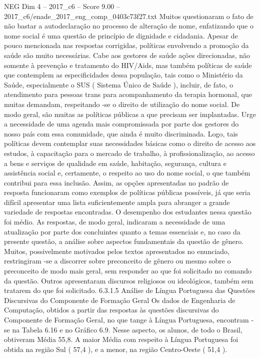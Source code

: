 \begin{textsample}{NEG Dim 4 – 2017\_c6 – Score 9.00 – 2017\_c6/enade\_2017\_eng\_comp\_0403c73f27.txt}
Muitos questionaram o fato de não bastar a autodeclaração no processo de alteração de nome, enfatizando que o nome social é uma questão de princípio de dignidade e cidadania.
Apesar de pouco mencionada nas respostas corrigidas, políticas envolvendo a promoção da saúde são muito necessárias.
Cabe aos gestores de saúde ações direcionadas, não somente à prevenção e tratamento do HIV/Aids, mas também políticas de saúde que contemplem as especificidades dessa população, tais como o Ministério da Saúde, especialmente o SUS ( Sistema Único de Saúde ), incluir, de fato, o atendimento para pessoas trans para acompanhamento da terapia hormonal, que muitas demandam, respeitando -se o direito de utilização do nome social.
De modo geral, são muitas as políticas públicas a que precisam ser implantadas.
Urge a necessidade de uma agenda mais compromissada por parte dos gestores do nosso país com essa comunidade, que ainda é muito discriminada.
Logo, tais políticas devem contemplar suas necessidades básicas como o direito de acesso aos estudos, à capacitação para o mercado de trabalho, à profissionalização, ao acesso a bens e serviços de qualidade em saúde, habitação, segurança, cultura e assistência social e, certamente, o respeito ao uso do nome social, o que também contribui para essa inclusão.
Assim, as opções apresentadas no padrão de resposta funcionaram como exemplos de políticas públicas possíveis, já que seria difícil apresentar uma lista suficientemente ampla para abranger a grande variedade de respostas encontradas.
O desempenho dos estudantes nessa questão foi médio.
As respostas, de modo geral, indicaram a necessidade de uma atualização por parte dos concluintes quanto a temas essenciais e, no caso da presente questão, a análise sobre aspectos fundamentais da questão de gênero.
Muitos, possivelmente motivados pelos textos apresentados no enunciado, restringiram -se a discorrer sobre preconceito de gênero ou mesmo sobre o preconceito de modo mais geral, sem responder ao que foi solicitado no comando da questão.
Outros apresentaram discursos religiosos ou ideológicos, também sem tratarem do que foi solicitado. 6.3.1.5 Análise de Língua Portuguesa das Questões Discursivas do Componente de Formação Geral Os dados de Engenharia de Computação, obtidos a partir das respostas às questões discursivas do Componente de Formação Geral, no que tange à Língua Portuguesa, encontram -se na Tabela 6.16 e no Gráfico 6.9.
Nesse aspecto, os alunos, de todo o Brasil, obtiveram Média 55,8.
A maior Média com respeito à Língua Portuguesa foi obtida na região Sul ( 57,4 ), e a menor, na região Centro-Oeste ( 51,4 ).

\end{textsample}
